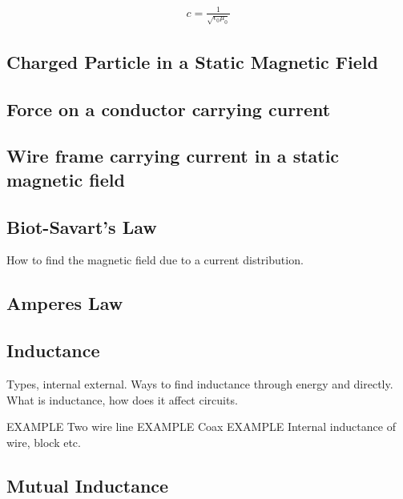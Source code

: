 \documentclass{ximera}
\begin{document}
\begin{eqnarray}
c=\frac{1}{\sqrt{\epsilon_0 \mu_0}}
\end{eqnarray}  

 
\subsection{Charged Particle in a Static Magnetic Field}



\subsection{Force on a conductor carrying current}


\subsection{Wire frame carrying current in a static magnetic field}


\subsection{Biot-Savart's Law}
How to find the magnetic field due to a current distribution.





\subsection{Amperes Law}


\subsection{Inductance}
Types, internal external.  Ways to find inductance through energy and directly. What is inductance, how does it affect circuits.

{\large EXAMPLE} Two wire line
{\large EXAMPLE} Coax
{\large EXAMPLE} Internal inductance of wire, block etc.

\subsection{Mutual Inductance}
\end{document}
